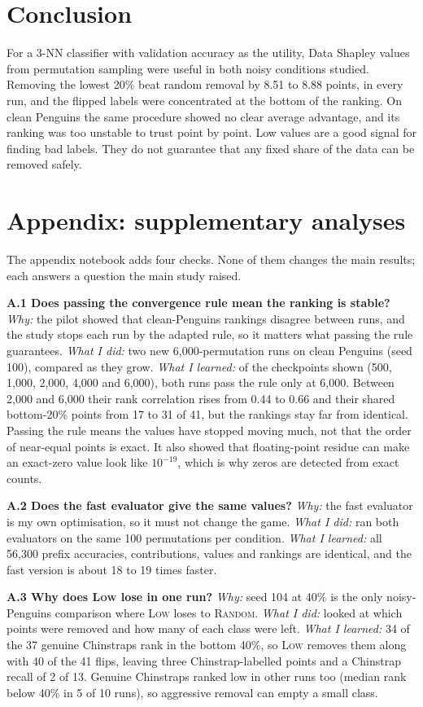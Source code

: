 \documentclass[10pt]{article}
\newcommand{\low}{\textsc{Low}}
\newcommand{\rand}{\textsc{Random}}
\begin{document}
\section{Conclusion}
For a 3-NN classifier with validation accuracy as the utility, Data Shapley values from permutation sampling were useful in both noisy conditions studied. Removing the lowest 20\% beat random removal by 8.51 to 8.88 points, in every run, and the flipped labels were concentrated at the bottom of the ranking. On clean Penguins the same procedure showed no clear average advantage, and its ranking was too unstable to trust point by point. Low values are a good signal for finding bad labels. They do not guarantee that any fixed share of the data can be removed safely.

\section*{Appendix: supplementary analyses}
The appendix notebook adds four checks. None of them changes the main results; each answers a question the main study raised.

\textbf{A.1 Does passing the convergence rule mean the ranking is stable?}
\emph{Why:} the pilot showed that clean-Penguins rankings disagree between runs, and the study stops each run by the adapted rule, so it matters what passing the rule guarantees. \emph{What I did:} two new 6,000-permutation runs on clean Penguins (seed 100), compared as they grow. \emph{What I learned:} of the checkpoints shown (500, 1,000, 2,000, 4,000 and 6,000), both runs pass the rule only at 6,000. Between 2,000 and 6,000 their rank correlation rises from 0.44 to 0.66 and their shared bottom-20\% points from 17 to 31 of 41, but the rankings stay far from identical. Passing the rule means the values have stopped moving much, not that the order of near-equal points is exact. It also showed that floating-point residue can make an exact-zero value look like $10^{-19}$, which is why zeros are detected from exact counts.

\textbf{A.2 Does the fast evaluator give the same values?}
\emph{Why:} the fast evaluator is my own optimisation, so it must not change the game. \emph{What I did:} ran both evaluators on the same 100 permutations per condition. \emph{What I learned:} all 56,300 prefix accuracies, contributions, values and rankings are identical, and the fast version is about 18 to 19 times faster.

\textbf{A.3 Why does \low{} lose in one run?}
\emph{Why:} seed 104 at 40\% is the only noisy-Penguins comparison where \low{} loses to \rand{}. \emph{What I did:} looked at which points were removed and how many of each class were left. \emph{What I learned:} 34 of the 37 genuine Chinstraps rank in the bottom 40\%, so \low{} removes them along with 40 of the 41 flips, leaving three Chinstrap-labelled points and a Chinstrap recall of 2 of 13. Genuine Chinstraps ranked low in other runs too (median rank below 40\% in 5 of 10 runs), so aggressive removal can empty a small class.
\end{document}
